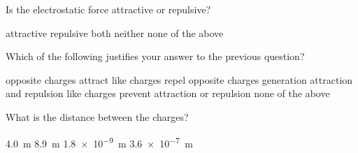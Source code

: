 \documentclass{exam}
\begin{document}
\begin{questions}
\begin{center}
\end{center}

\question \label{yETfik}
Is the electrostatic force attractive or repulsive?

\begin{randomizechoices}[keeplast]
    \correctchoice attractive
    \choice repulsive
    \choice both
    \choice neither
    \choice none of the above
\end{randomizechoices}

\question
Which of the following justifies your answer to the previous question?

\begin{randomizechoices}[keeplast]
    \correctchoice opposite charges attract
    \choice like charges repel
    \choice opposite charges generation attraction and repulsion
    \choice like charges prevent attraction or repulsion
    \choice none of the above
\end{randomizechoices}

\question \label{b4zyju}
What is the distance between the charges?

\begin{randomizechoices}
    \correctchoice \qty{4.0}{m}
    \choice \qty{8.9}{m}
    \choice \qty{1.8e-9}{m}
    \choice \qty{3.6e-7}{m}
\end{randomizechoices}
\vspace{1em}

\cyanhrule


\end{questions}
\end{document}
